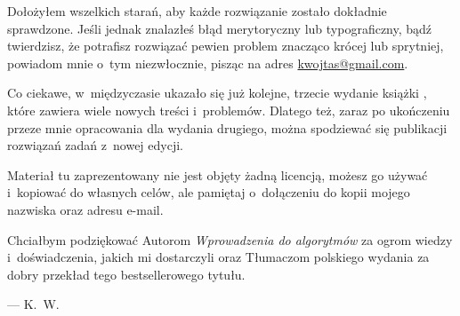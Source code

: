 Dołożyłem wszelkich starań, aby każde rozwiązanie zostało dokładnie sprawdzone. Jeśli jednak znalazłeś błąd merytoryczny lub typograficzny, bądź twierdzisz, że potrafisz rozwiązać pewien problem znacząco krócej lub sprytniej, powiadom mnie o~tym niezwłocznie, pisząc na adres \url{kwojtas@gmail.com}.

Co ciekawe, w~międzyczasie ukazało się już kolejne, trzecie wydanie książki \cite{cormen3}, które zawiera wiele nowych treści i~problemów. Dlatego też, zaraz po ukończeniu przeze mnie opracowania dla wydania drugiego, można spodziewać się publikacji rozwiązań zadań z~nowej edycji.

Materiał tu zaprezentowany nie jest objęty żadną licencją, możesz go używać i~kopiować do własnych celów, ale pamiętaj o~dołączeniu do kopii mojego nazwiska oraz adresu e-mail.

Chciałbym podziękować Autorom \textsl{Wprowadzenia do algorytmów} za ogrom wiedzy i~doświadczenia, jakich mi dostarczyli oraz Tłumaczom polskiego wydania za dobry przekład tego bestsellerowego tytułu.

\bigskip
{}\hfill--- K.~W.

\endinput
